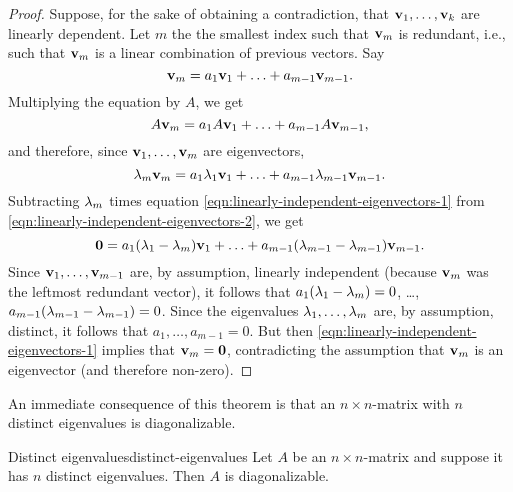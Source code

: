 \begin{proof}
  Suppose, for the sake of obtaining a contradiction, that
  $\mbox{\bf v}_1,\ldots,\mbox{\bf v}_k$ are linearly dependent. Let $m$ the
  the smallest index such that $\mbox{\bf v}_m$ is redundant, i.e., such
  that $\mbox{\bf v}_m$ is a linear combination of previous vectors.
  Say
  \begin{equation}\label{eqn:linearly-independent-eigenvectors-1}
    \mbox{\bf v}_m = a_1\mbox{\bf v}_1 + \ldots + a_{m-1}\mbox{\bf v}_{m-1}.
  \end{equation}
  Multiplying the equation by $A$, we get
  \begin{equation*}
    A\mbox{\bf v}_m = a_1A\mbox{\bf v}_1 + \ldots + a_{m-1}A\mbox{\bf v}_{m-1},
  \end{equation*}
  and therefore, since $\mbox{\bf v}_1,\ldots,\mbox{\bf v}_{m}$ are
  eigenvectors,
  \begin{equation}\label{eqn:linearly-independent-eigenvectors-2}
    \lambda_m\mbox{\bf v}_m = a_1\lambda_1\mbox{\bf v}_1 + \ldots + a_{m-1}\lambda_{m-1}\mbox{\bf v}_{m-1}.
  \end{equation}
  Subtracting $\lambda_m$ times equation
  {\eqref{eqn:linearly-independent-eigenvectors-1}}  from
  {\eqref{eqn:linearly-independent-eigenvectors-2}}, we get
  \begin{equation*}
    \mbox{\bf 0} = a_1(\lambda_1-\lambda_m)\mbox{\bf v}_1 + \ldots + a_{m-1}(\lambda_{m-1}-\lambda_{m-1})\mbox{\bf v}_{m-1}.
  \end{equation*}
  Since $\mbox{\bf v}_1,\ldots,\mbox{\bf v}_{m-1}$ are, by assumption,
  linearly independent (because $\mbox{\bf v}_m$ was the leftmost redundant
  vector), it follows that $a_1(\lambda_1-\lambda_m)=0$, \ldots,
  $a_{m-1}(\lambda_{m-1}-\lambda_{m-1})=0$. Since the eigenvalues
  $\lambda_1,\ldots,\lambda_m$ are, by assumption, distinct, it
  follows that $a_1,\ldots,a_{m-1}=0$. But then
  {\eqref{eqn:linearly-independent-eigenvectors-1}} implies that
  $\mbox{\bf v}_m=\mbox{\bf 0}$, contradicting the assumption that $\mbox{\bf v}_m$ is an
  eigenvector (and therefore non-zero).
\end{proof}

An immediate consequence of this theorem is that an $n\times n$-matrix
with $n$ distinct eigenvalues is diagonalizable.

\begin{corollary}{Distinct eigenvalues}{distinct-eigenvalues}
  Let $A$ be an $n\times n$-matrix and suppose it has $n$ distinct
  eigenvalues. Then $A$ is diagonalizable.
\end{corollary}

